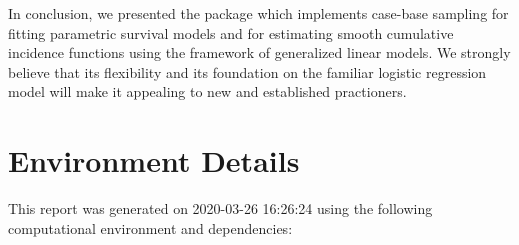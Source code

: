 \documentclass[
]{jss}
\begin{document}
In conclusion, we presented the  package 
which implements case-base sampling for fitting parametric survival
models and for estimating smooth cumulative incidence functions using
the framework of generalized linear models. We strongly believe that its
flexibility and its foundation on the familiar logistic regression model
will make it appealing to new and established practioners.

\hypertarget{environment-details}{%
\section{Environment Details}\label{environment-details}}

This report was generated on 2020-03-26 16:26:24 using the following
computational environment and dependencies:
\end{document}
